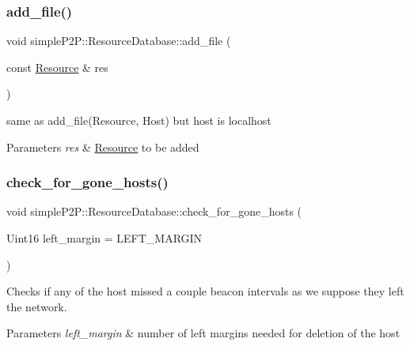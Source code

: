 \subsubsection{\texorpdfstring{add\+\_\+file()}{add\_file()}\hspace{0.1cm}{\footnotesize\ttfamily [2/2]}}
{\footnotesize\ttfamily void simple\+P2\+P\+::\+Resource\+Database\+::add\+\_\+file (\begin{DoxyParamCaption}\item[{const \hyperlink{classsimpleP2P_1_1Resource}{Resource} \&}]{res }\end{DoxyParamCaption})}



same as add\+\_\+file(\+Resource, Host) but host is localhost 


\begin{DoxyParams}{Parameters}
{\em res} & \hyperlink{classsimpleP2P_1_1Resource}{Resource} to be added \\
\hline
\end{DoxyParams}
\mbox{\label{classsimpleP2P_1_1ResourceDatabase_a98531f381542ba5c0ec28f455f56ec26}} 
\subsubsection{\texorpdfstring{check\+\_\+for\+\_\+gone\+\_\+hosts()}{check\_for\_gone\_hosts()}}
{\footnotesize\ttfamily void simple\+P2\+P\+::\+Resource\+Database\+::check\+\_\+for\+\_\+gone\+\_\+hosts (\begin{DoxyParamCaption}\item[{Uint16}]{left\+\_\+margin = {\ttfamily LEFT\+\_\+MARGIN} }\end{DoxyParamCaption})}



Checks if any of the host missed a couple beacon intervals as we suppose they left the network. 


\begin{DoxyParams}{Parameters}
{\em left\+\_\+margin} & number of left margins needed for deletion of the host \\
\hline
\end{DoxyParams}
\mbox{\label{classsimpleP2P_1_1ResourceDatabase_ac0bd5de646419fe620f641502a400028}} 
